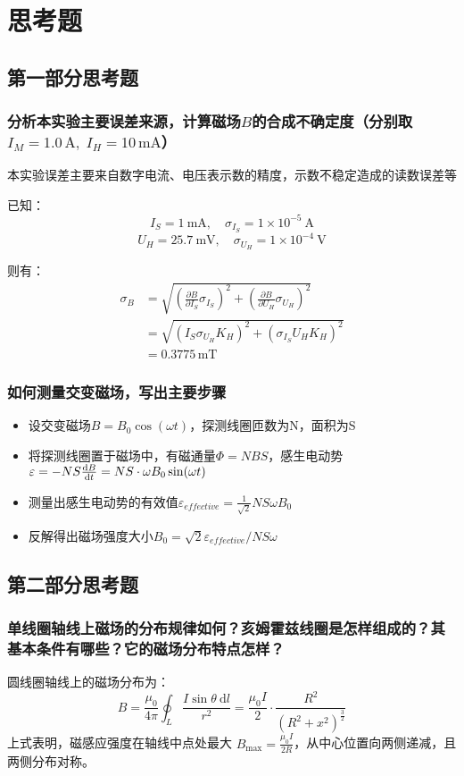 \documentclass[11pt]{article}
\begin{document}
	

	\section{思考题}
	
	\subsection{第一部分思考题}
	\subsubsection{分析本实验主要误差来源，计算磁场$ B $的合成不确定度（分别取$ I_M=1.0\,\mathrm A,\;I_H=10\,\mathrm{mA} $）}
	本实验误差主要来自数字电流、电压表示数的精度，示数不稳定造成的读数误差等
	
	已知：
	\[I_S = 1 \ \mathrm{mA},\quad \sigma_{I_S} = 1\times10^{-5} \ \mathrm{A}\]
	\[U_H = 25.7 \ \mathrm{mV},\quad \sigma_{U_H} = 1\times10^{-4} \ \mathrm{V}\]
	
	则有：
	\begin{align*}
		\sigma_B & =\sqrt{\left(\frac{\partial B}{\partial I_S}\sigma_{I_S}\right)^2+\left(\frac{\partial B}{\partial U_H}\sigma_{U_H}\right)^2}\\
		& =\sqrt{(I_S\sigma_{U_H}K_H)^2+(\sigma_{I_S}U_HK_H)^2}\\
		& = 0.3775 \,\mathrm{mT}
	\end{align*}
	
	
	\subsubsection{如何测量交变磁场，写出主要步骤}
	\begin{itemize}
		\item 设交变磁场$B=B_0 \cos (\omega t)$，探测线圈匝数为N，面积为S
		\item 将探测线圈置于磁场中，有磁通量$\Phi=NBS$，感生电动势$\varepsilon = -NS \dv{B}{t}=NS\cdot \omega B_0 \sin (\omega t)$
		\item 测量出感生电动势的有效值$\varepsilon_{effective}=\frac{1}{\sqrt{2}}NS\omega B_0$
		\item 反解得出磁场强度大小$B_0=\sqrt{2}\varepsilon_{effective}/NS\omega$
	\end{itemize}
	
	
	\subsection{第二部分思考题}
	\subsubsection{单线圈轴线上磁场的分布规律如何？亥姆霍兹线圈是怎样组成的？其基本条件有哪些？它的磁场分布特点怎样？}
	圆线圈轴线上的磁场分布为：
	\begin{equation*}\label{单线圈轴线上磁场分布}
		B = \frac{\mu_0}{4 \pi} \oint_L \frac{I\sin \theta \ \mathrm{d} l}{r^2} = \frac{\mu_0 I}{2}\cdot \frac{R^2}{\left( R^2 + x^2 \right)^{\frac{3}{2}}}
	\end{equation*}
	上式表明，磁感应强度在轴线中点处最大 $B_{\max} = \frac{\mu_0 I}{2 R}$，从中心位置向两侧递减，且两侧分布对称。
	
\end{document}
